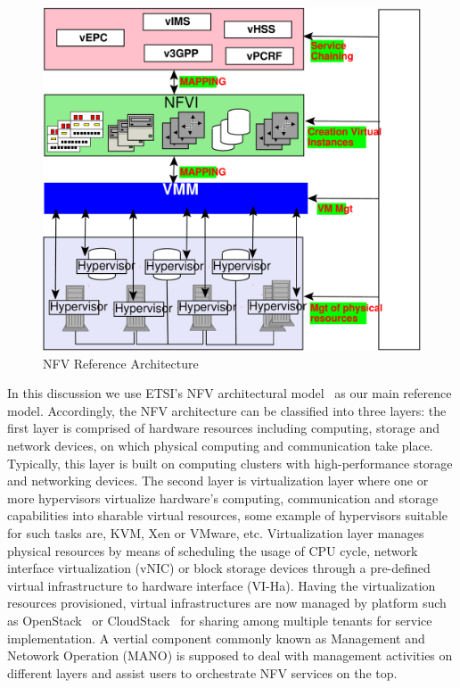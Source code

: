 \label{scenario}
\begin{figure}[t]
	\centering
	\includegraphics[scale=0.23]{fig/architecture-single.pdf}
	\caption{NFV Reference Architecture}
	\label{fig:arch}
\end{figure} 

In this discussion we use ETSI's NFV architectural model~\cite{nfv} as our main
reference model. Accordingly, the NFV architecture can be classified into three
layers: the first layer is comprised of hardware resources including computing,
storage and network devices, on which physical computing and communication take
place. Typically, this layer is built on computing clusters with
high-performance storage and networking devices. The second layer is
virtualization layer where one or more hypervisors virtualize hardware's
computing, communication and storage capabilities into sharable virtual
resources, some example of hypervisors suitable for such tasks are, KVM, Xen or
VMware, etc. Virtualization layer manages physical resources by means of
scheduling the usage of CPU cycle, network interface virtualization (vNIC) or
block storage devices through a pre-defined virtual infrastructure to hardware
interface (VI-Ha). Having the virtualization resources provisioned, virtual
infrastructures are now managed by platform such as OpenStack~\cite{openstack}
or CloudStack~\cite{cloudstack} for sharing among multiple tenants for service
implementation. A vertial component commonly known as Management and Netowork
Operation (MANO) is supposed to deal with management activities on different
layers and assist users to orchestrate NFV services on the top. 

